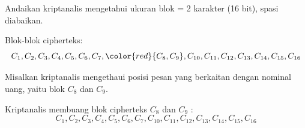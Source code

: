 \documentclass{article}
\begin{document}

Andaikan kriptanalis mengetahui ukuran blok = 2 karakter (16 bit), spasi diabaikan.

Blok-blok cipherteks:
\[ C_{1}, C_{2}, C_{3}, C_{4}, C_{5}, C_{6}, C_{7}, \color{red}{C_{8}, C_{9}}, C_{10}, C_{11}, C_{12}, C_{13}, C_{14}, C_{15}, C_{16} \]

Misalkan kriptanalis mengethaui posisi pesan yang berkaitan dengan nominal uang, yaitu blok $C_{8}$ dan $C_{9}$.

Kriptanalis membuang blok cipherteks $C_{8}$ dan $C_{9}$ :
\[ C_{1}, C_{2}, C_{3}, C_{4}, C_{5}, C_{6}, C_{7}, C_{10}, C_{11}, C_{12}, C_{13}, C_{14}, C_{15}, C_{16} \]
\end{document}
